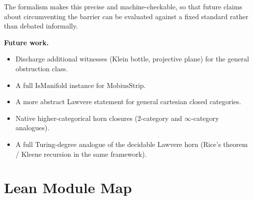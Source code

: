 \documentclass[11pt]{article}
\begin{document}
\noindent
The formalism makes this precise and machine-checkable, so that future
claims about circumventing the barrier can be evaluated against a
fixed standard rather than debated informally.

\medskip
\noindent\textbf{Future work.}
\begin{itemize}[leftmargin=1.5em,itemsep=0.15ex,topsep=0.3ex,parsep=0pt]
\item Discharge additional witnesses (Klein bottle, projective plane) for
  the general obstruction class.
\item A full $\mathrm{IsManifold}$ instance for
  $\mathrm{MobiusStrip}$.
\item A more abstract Lawvere statement for general cartesian closed
  categories.
\item Native higher-categorical horn closures ($2$-category and
  $\infty$-category analogues).
\item A full Turing-degree analogue of the decidable Lawvere horn
  (Rice's theorem / Kleene recursion in the same framework).
\end{itemize}

\appendix

\section{Lean Module Map}
\label{app:modules}
\end{document}

